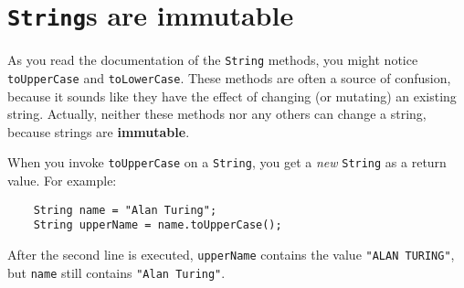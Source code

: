 \documentclass[12pt]{book}
\theoremstyle{definition}
\begin{document}



%



\section{{\tt String}s are immutable}
\label{immutable}

As you read the documentation of the {\tt String} methods, you
might notice {\tt toUpperCase} and {\tt toLowerCase}.  These
methods are often a source of confusion, because it sounds
like they have the effect of changing (or mutating) an
existing string.  Actually, neither these methods nor any
others can change a string, because strings are {\bf immutable}.

When you invoke {\tt toUpperCase} on a {\tt String}, you get a
{\em new} {\tt String} as a return value.  For example:

\begin{lstlisting}
    String name = "Alan Turing";
    String upperName = name.toUpperCase();
\end{lstlisting}
%
After the second line is executed, {\tt upperName} contains
the value {\tt "ALAN TURING"}, but {\tt name} still contains
{\tt "Alan Turing"}.
\end{document}
